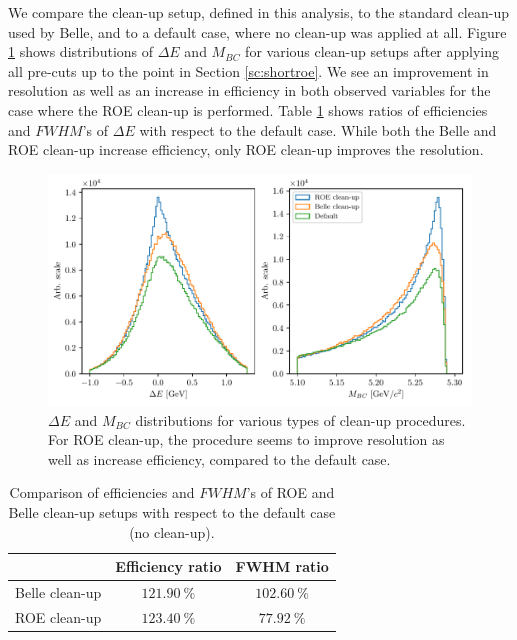 \documentclass[oneside,a4paper,openany,12pt]{scrbook}
\begin{document}
We compare the clean-up setup, defined in this analysis, to the standard clean-up used by Belle, and to a default case, where no clean-up was applied at all. Figure \ref{fig:roe_opt} shows distributions of $\Delta E$ and $M_{BC}$ for various clean-up setups after applying all pre-cuts up to the point in Section \ref{sc:shortroe}. We see an improvement in resolution as well as an increase in efficiency in both observed variables for the case where the ROE clean-up is performed. Table \ref{tab:roeeff} shows ratios of efficiencies and $FWHM$'s of $\Delta E$ with respect to the default case. While both the Belle and ROE clean-up increase efficiency, only ROE clean-up improves the resolution.


\begin{figure}[H]
\centering
\captionsetup{width=0.8\linewidth}
\includegraphics[width=\linewidth]{fig/roe_opt}
\caption{$\Delta E$ and $M_{BC}$ distributions for various types of clean-up procedures. For ROE clean-up, the procedure seems to improve resolution as well as increase efficiency, compared to the default case.}
\label{fig:roe_opt}
\end{figure}

\begin{table}[H]
\centering
\begin{tabular}{|c|c|c|}
\hline
 & Efficiency ratio & FWHM ratio \\
 \hline 
 Belle clean-up & $121.90~\%$  & $102.60~\%$  \\
 \hline
 ROE clean-up & $123.40~\%$ & $77.92~\%$ \\
 \hline
\end{tabular}
\caption{Comparison of efficiencies and $FWHM$'s of ROE and Belle clean-up setups with respect to the default case (no clean-up).}
\label{tab:roeeff}
\end{table}
\end{document}
